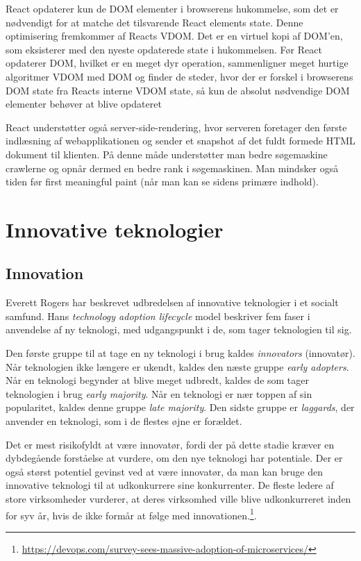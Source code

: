 \documentclass[]{article}
\begin{document}
React opdaterer kun de DOM elementer i browserens hukommelse, som det er
nødvendigt for at matche det tilsvarende React elements state. Denne
optimisering fremkommer af Reacts VDOM. Det er en virtuel kopi af
DOM'en, som eksisterer med den nyeste opdaterede state i hukommelsen.
Før React opdaterer DOM, hvilket er en meget dyr operation, sammenligner
meget hurtige algoritmer VDOM med DOM og finder de steder, hvor der er
forskel i browserens DOM state fra Reacts interne VDOM state, så kun de
absolut nødvendige DOM elementer behøver at blive opdateret

React understøtter også server-side-rendering, hvor serveren foretager
den første indlæsning af webapplikationen og sender et snapshot af det
fuldt formede HTML dokument til klienten. På denne måde understøtter man
bedre søgemaskine crawlerne og opnår dermed en bedre rank i
søgemaskinen. Man mindsker også tiden før first meaningful paint (når
man kan se sidens primære indhold).

\hypertarget{innovative-teknologier}{%
\section{Innovative teknologier}\label{innovative-teknologier}}

\hypertarget{innovation}{%
\subsection{Innovation}\label{innovation}}

Everett Rogers har beskrevet udbredelsen af innovative teknologier i et
socialt samfund. Hans \emph{technology adoption lifecycle} model
beskriver fem faser i anvendelse af ny teknologi, med udgangspunkt i de,
som tager teknologien til sig.

Den første gruppe til at tage en ny teknologi i brug kaldes
\emph{innovators} (innovatør). Når teknologien ikke længere er ukendt,
kaldes den næste gruppe \emph{early adopters}. Når en teknologi begynder
at blive meget udbredt, kaldes de som tager teknologien i brug
\emph{early majority}. Når en teknologi er nær toppen af sin
popularitet, kaldes denne gruppe \emph{late majority}. Den sidste gruppe
er \emph{laggards}, der anvender en teknologi, som i de flestes øjne er
forældet.

Det er mest risikofyldt at være innovatør, fordi der på dette stadie
kræver en dybdegående forståelse at vurdere, om den nye teknologi har
potentiale. Der er også størst potentiel gevinst ved at være innovatør,
da man kan bruge den innovative teknologi til at udkonkurrere sine
konkurrenter. De fleste ledere af store virksomheder vurderer, at deres
virksomhed ville blive udkonkurreret inden for syv år, hvis de ikke
formår at følge med innovationen.\footnote{\url{https://devops.com/survey-sees-massive-adoption-of-microservices/}}.
\end{document}
